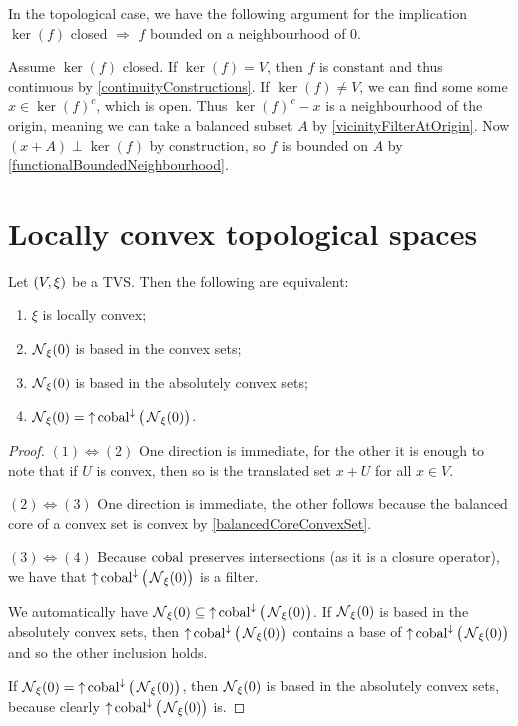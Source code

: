 \begin{note}
In the topological case, we have the following argument for the implication $\ker(f)$ closed $\Rightarrow$ $f$ bounded on a neighbourhood of $0$.

Assume $\ker(f)$ closed. If $\ker(f) = V$, then $f$ is constant and thus continuous by \ref{continuityConstructions}. If $\ker(f) \neq V$, we can find some some $x\in \ker(f)^c$, which is open. Thus $\ker(f)^c - x$ is a neighbourhood of the origin, meaning we can take a balanced subset $A$ by \ref{vicinityFilterAtOrigin}. Now $(x+A)\perp \ker(f)$ by construction, so $f$ is bounded on $A$ by \ref{functionalBoundedNeighbourhood}.
\end{note}

\section{Locally convex topological spaces}
\begin{lemma} \label{locallyConvexNeighbourhoodsLemma}
Let $\sSet{V,\xi}$ be a TVS. Then the following are equivalent:
\begin{enumerate}
\item $\xi$ is locally convex;
\item $\operatorname{\mathcal{N}}_\xi(0)$ is based in the convex sets;
\item $\operatorname{\mathcal{N}}_\xi(0)$ is based in the absolutely convex sets;
\item $\operatorname{\mathcal{N}}_\xi(0) = \operatorname{\uparrow}\operatorname{cobal}^{\downarrow}\big(\operatorname{\mathcal{N}}_\xi(0)\big)$.
\end{enumerate}
\end{lemma}
\begin{proof}
$(1) \Leftrightarrow (2)$ One direction is immediate, for the other it is enough to note that if $U$ is convex, then so is the translated set $x+U$ for all $x\in V$.

$(2) \Leftrightarrow (3)$ One direction is immediate, the other follows because the balanced core of a convex set is convex by \ref{balancedCoreConvexSet}.

$(3) \Leftrightarrow (4)$ Because $\operatorname{cobal}$ preserves intersections (as it is a closure operator), we have that $\operatorname{\uparrow}\operatorname{cobal}^{\downarrow}\big(\operatorname{\mathcal{N}}_\xi(0)\big)$ is a filter.

We automatically have $\operatorname{\mathcal{N}}_\xi(0) \subseteq \operatorname{\uparrow}\operatorname{cobal}^{\downarrow}\big(\operatorname{\mathcal{N}}_\xi(0)\big)$. If $\operatorname{\mathcal{N}}_\xi(0)$ is based in the absolutely convex sets, then $\operatorname{\uparrow}\operatorname{cobal}^{\downarrow}\big(\operatorname{\mathcal{N}}_\xi(0)\big)$ contains a base of $\operatorname{\uparrow}\operatorname{cobal}^{\downarrow}\big(\operatorname{\mathcal{N}}_\xi(0)\big)$ and so the other inclusion holds.

If $\operatorname{\mathcal{N}}_\xi(0) = \operatorname{\uparrow}\operatorname{cobal}^{\downarrow}\big(\operatorname{\mathcal{N}}_\xi(0)\big)$, then $\operatorname{\mathcal{N}}_\xi(0)$ is based in the absolutely convex sets, because clearly $\operatorname{\uparrow}\operatorname{cobal}^{\downarrow}\big(\operatorname{\mathcal{N}}_\xi(0)\big)$ is.
\end{proof}

